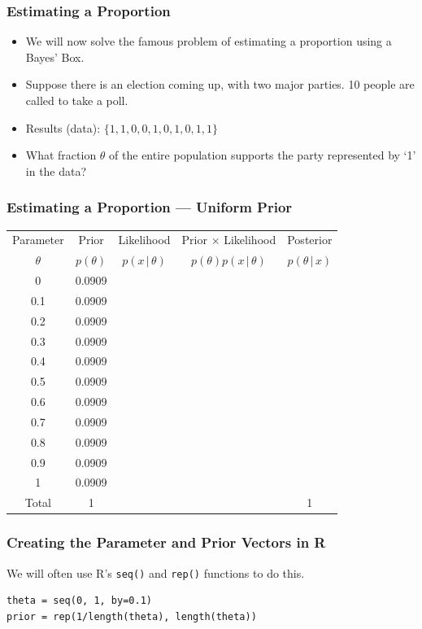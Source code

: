 \documentclass{beamer}
\newcommand{\given}{\,|\,}
\begin{document}
\begin{frame}
\frametitle{Estimating a Proportion}

\begin{itemize}
\item We will now solve the famous problem of estimating a
proportion using a Bayes' Box.\pause
\item Suppose there is an election coming up, with two major
parties. 10 people are called to take a poll.\pause
\item Results (data): $\{1, 1, 0, 0, 1, 0, 1, 0, 1, 1\}$\pause
\item What fraction $\theta$ of the entire population supports the party
represented by `1' in the data?
\end{itemize}

\end{frame}

\begin{frame}
\frametitle{Estimating a Proportion --- Uniform Prior}

\centering
{\footnotesize
\begin{tabular}{|c|c|c|c|c|}
\hline
Parameter & Prior & Likelihood & Prior $\times$ Likelihood & Posterior \\
$\theta$  & $p(\theta)$ & $p(x \given \theta)$ & $p(\theta)p(x\given\theta)$ & $p(\theta\given x)$ \\
\hline
0 & 0.0909 & & & \\
0.1 & 0.0909  &  & & \\
0.2 & 0.0909  &  & & \\
0.3 & 0.0909 &  & & \\
0.4 & 0.0909  &  & & \\
0.5 & 0.0909 & & & \\
0.6 & 0.0909 & & & \\
0.7 & 0.0909 & & & \\
0.8 & 0.0909 & & & \\
0.9 & 0.0909 & & & \\
1   & 0.0909 & & & \\
\hline
Total & 1 & & & 1 \\
\hline
\end{tabular}
}

\end{frame}


\begin{frame}[fragile]
\frametitle{Creating the Parameter and Prior Vectors in R}
We will often use R's \texttt{seq()} and
\texttt{rep()} functions to do this.\pause

\begin{verbatim}
theta = seq(0, 1, by=0.1)
prior = rep(1/length(theta), length(theta))
\end{verbatim}

\end{frame}
\end{document}
